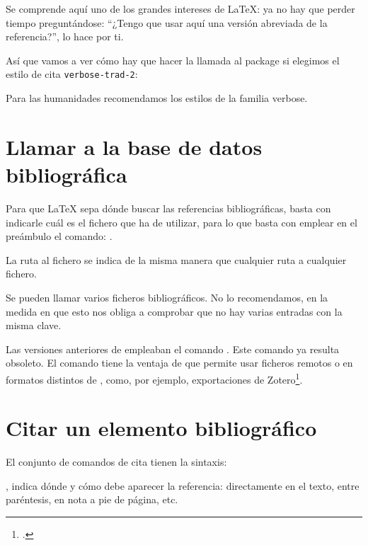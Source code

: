 Se comprende aquí uno de los grandes intereses de \LaTeX{}: ya no hay
que perder tiempo preguntándose: \enquote{¿Tengo que usar aquí una
  versión abreviada de la referencia?},  lo hace por
ti.

Así que vamos a ver cómo hay que hacer la llamada al package si
elegimos el estilo de cita \verb|verbose-trad-2|:

\begin{latexcode}
\usepackage[citestyle=verbose-trad2]{biblatex}
\end{latexcode}

Para las humanidades recomendamos los estilos de la familia verbose.


\section{Llamar a la base de datos bibliográfica}


Para que \LaTeX{} sepa dónde buscar las referencias bibliográficas,
basta con indicarle cuál es el fichero  que ha de utilizar,
para lo que basta con emplear en el preámbulo el comando:
.

La ruta al fichero se indica de la misma manera que cualquier ruta a
cualquier fichero.

\begin{attention}
Se pueden llamar varios ficheros bibliográficos. No lo recomendamos,
en la medida en que esto nos obliga a comprobar que no hay varias
entradas con la misma clave.
\end{attention}

\begin{plusloins}
Las versiones anteriores de  empleaban el comando
. Este comando ya resulta obsoleto. El comando
 tiene la ventaja de que permite usar ficheros
remotos o en formatos distintos de , como, por ejemplo,
exportaciones de Zotero\footcite{biblatex_resources}.
\end{plusloins}

\section{Citar un elemento bibliográfico}

El conjunto de comandos de cita tienen la sintaxis:

,
 indica dónde y cómo debe aparecer la referencia:
directamente en el texto, entre paréntesis, en nota a pie de página, etc.


